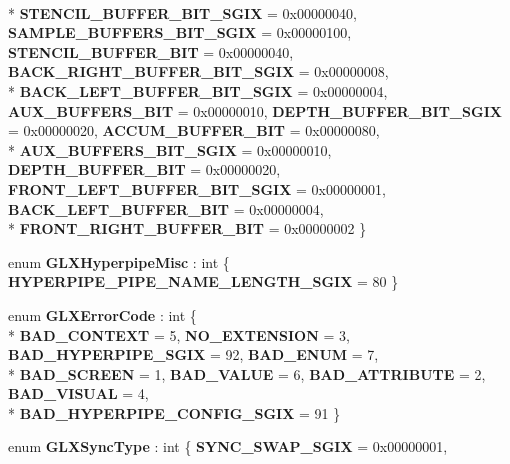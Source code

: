 \begin{DoxyCompactItemize}
\\*
{\bfseries S\-T\-E\-N\-C\-I\-L\-\_\-\-B\-U\-F\-F\-E\-R\-\_\-\-B\-I\-T\-\_\-\-S\-G\-I\-X} = 0x00000040, 
{\bfseries S\-A\-M\-P\-L\-E\-\_\-\-B\-U\-F\-F\-E\-R\-S\-\_\-\-B\-I\-T\-\_\-\-S\-G\-I\-X} = 0x00000100, 
{\bfseries S\-T\-E\-N\-C\-I\-L\-\_\-\-B\-U\-F\-F\-E\-R\-\_\-\-B\-I\-T} = 0x00000040, 
{\bfseries B\-A\-C\-K\-\_\-\-R\-I\-G\-H\-T\-\_\-\-B\-U\-F\-F\-E\-R\-\_\-\-B\-I\-T\-\_\-\-S\-G\-I\-X} = 0x00000008, 
\\*
{\bfseries B\-A\-C\-K\-\_\-\-L\-E\-F\-T\-\_\-\-B\-U\-F\-F\-E\-R\-\_\-\-B\-I\-T\-\_\-\-S\-G\-I\-X} = 0x00000004, 
{\bfseries A\-U\-X\-\_\-\-B\-U\-F\-F\-E\-R\-S\-\_\-\-B\-I\-T} = 0x00000010, 
{\bfseries D\-E\-P\-T\-H\-\_\-\-B\-U\-F\-F\-E\-R\-\_\-\-B\-I\-T\-\_\-\-S\-G\-I\-X} = 0x00000020, 
{\bfseries A\-C\-C\-U\-M\-\_\-\-B\-U\-F\-F\-E\-R\-\_\-\-B\-I\-T} = 0x00000080, 
\\*
{\bfseries A\-U\-X\-\_\-\-B\-U\-F\-F\-E\-R\-S\-\_\-\-B\-I\-T\-\_\-\-S\-G\-I\-X} = 0x00000010, 
{\bfseries D\-E\-P\-T\-H\-\_\-\-B\-U\-F\-F\-E\-R\-\_\-\-B\-I\-T} = 0x00000020, 
{\bfseries F\-R\-O\-N\-T\-\_\-\-L\-E\-F\-T\-\_\-\-B\-U\-F\-F\-E\-R\-\_\-\-B\-I\-T\-\_\-\-S\-G\-I\-X} = 0x00000001, 
{\bfseries B\-A\-C\-K\-\_\-\-L\-E\-F\-T\-\_\-\-B\-U\-F\-F\-E\-R\-\_\-\-B\-I\-T} = 0x00000004, 
\\*
{\bfseries F\-R\-O\-N\-T\-\_\-\-R\-I\-G\-H\-T\-\_\-\-B\-U\-F\-F\-E\-R\-\_\-\-B\-I\-T} = 0x00000002
 \}
\item 
enum {\bfseries G\-L\-X\-Hyperpipe\-Misc} \-: int \{ {\bfseries H\-Y\-P\-E\-R\-P\-I\-P\-E\-\_\-\-P\-I\-P\-E\-\_\-\-N\-A\-M\-E\-\_\-\-L\-E\-N\-G\-T\-H\-\_\-\-S\-G\-I\-X} = 80
 \}
\item 
enum {\bfseries G\-L\-X\-Error\-Code} \-: int \{ \\*
{\bfseries B\-A\-D\-\_\-\-C\-O\-N\-T\-E\-X\-T} = 5, 
{\bfseries N\-O\-\_\-\-E\-X\-T\-E\-N\-S\-I\-O\-N} = 3, 
{\bfseries B\-A\-D\-\_\-\-H\-Y\-P\-E\-R\-P\-I\-P\-E\-\_\-\-S\-G\-I\-X} = 92, 
{\bfseries B\-A\-D\-\_\-\-E\-N\-U\-M} = 7, 
\\*
{\bfseries B\-A\-D\-\_\-\-S\-C\-R\-E\-E\-N} = 1, 
{\bfseries B\-A\-D\-\_\-\-V\-A\-L\-U\-E} = 6, 
{\bfseries B\-A\-D\-\_\-\-A\-T\-T\-R\-I\-B\-U\-T\-E} = 2, 
{\bfseries B\-A\-D\-\_\-\-V\-I\-S\-U\-A\-L} = 4, 
\\*
{\bfseries B\-A\-D\-\_\-\-H\-Y\-P\-E\-R\-P\-I\-P\-E\-\_\-\-C\-O\-N\-F\-I\-G\-\_\-\-S\-G\-I\-X} = 91
 \}
\item 
enum {\bfseries G\-L\-X\-Sync\-Type} \-: int \{ {\bfseries S\-Y\-N\-C\-\_\-\-S\-W\-A\-P\-\_\-\-S\-G\-I\-X} = 0x00000001, 

\end{DoxyCompactItemize}
